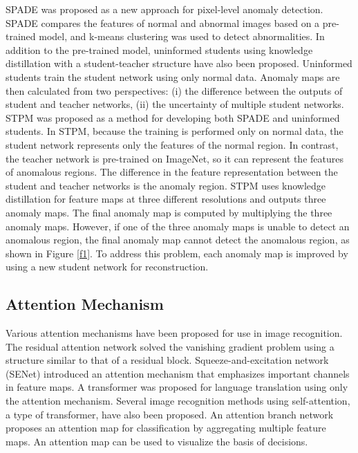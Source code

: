 \documentclass[letterpaper, 10 pt, conference]{ieeeconf}
\begin{document}
SPADE \cite{c26} was proposed as a new approach for pixel-level anomaly detection. SPADE compares the features of normal and abnormal images based on a pre-trained model, and k-means clustering was used to detect abnormalities. In addition to the pre-trained model, uninformed students \cite{c1} using knowledge distillation with a student-teacher structure have also been proposed. Uninformed students train the student network using only normal data. Anomaly maps are then calculated from two perspectives: (i) the difference between the outputs of student and teacher networks, (ii) the uncertainty of multiple student networks. STPM\cite{c14} was proposed as a method for developing both SPADE and uninformed students. In STPM, because the training is performed only on normal data, the student network represents only the features of the normal region. In contrast, the teacher network is pre-trained on ImageNet, so it can represent the features of anomalous regions. The difference in the feature representation between the student and teacher networks is the anomaly region. STPM uses knowledge distillation for feature maps at three different resolutions and outputs three anomaly maps. The final anomaly map is  computed by multiplying the three anomaly maps. However, if one of the three anomaly maps is unable to detect an anomalous region, the final anomaly map cannot detect the anomalous region, as shown in Figure \ref{f1}. To address this problem, each anomaly map is improved by using a new student network for reconstruction. 


\subsection{Attention Mechanism}

Various attention mechanisms have been proposed for use in image recognition. The residual attention network \cite{c27} solved the vanishing gradient problem using a structure similar to that of a residual block. Squeeze-and-excitation network (SENet)\cite{c28} introduced an attention mechanism that emphasizes important channels in feature maps. A transformer \cite{c29} was proposed for language translation using only the attention mechanism. Several image recognition methods using self-attention, a type of transformer, have also been proposed\cite{c32, c33, c34}. An attention branch network\cite{c35} proposes an attention map for classification by aggregating multiple feature maps. An attention map can be used to visualize the basis of decisions. 
\end{document}
